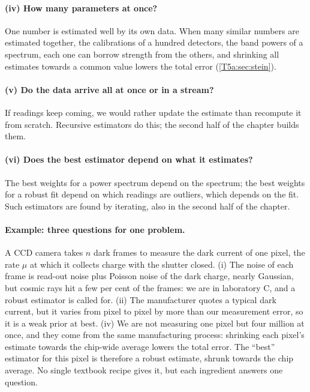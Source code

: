 \paragraph{(iv) How many parameters at once?} One number is estimated well
by its own data. When many similar numbers are estimated together, the
calibrations of a hundred detectors, the band powers of a spectrum, each one
can borrow strength from the others, and shrinking all estimates towards a
common value lowers the total error (\cref{T5a:sec:stein}).

\paragraph{(v) Do the data arrive all at once or in a stream?} If readings
keep coming, we would rather update the estimate than recompute it from
scratch. Recursive estimators do this; the second half of the chapter
builds them.

\paragraph{(vi) Does the best estimator depend on what it estimates?} The
best weights for a power spectrum depend on the spectrum; the best weights
for a robust fit depend on which readings are outliers, which depends on the
fit. Such estimators are found by iterating, also in the second half of the
chapter.

\paragraph{Example: three questions for one problem.} A CCD camera takes
$n$ dark frames to measure the dark current of one pixel, the rate $\mu$ at
which it collects charge with the shutter closed. (i) The noise of each frame
is read-out noise plus Poisson noise of the dark charge, nearly Gaussian, but
cosmic rays hit a few per cent of the frames: we are in laboratory C, and a
robust estimator is called for. (ii) The manufacturer quotes a typical dark
current, but it varies from pixel to pixel by more than our measurement
error, so it is a weak prior at best. (iv) We are not measuring one pixel
but four million at once, and they come from the same manufacturing process:
shrinking each pixel's estimate towards the chip-wide average lowers the
total error. The ``best'' estimator for this pixel is therefore a robust
estimate, shrunk towards the chip average. No single textbook recipe gives
it, but each ingredient answers one question.


